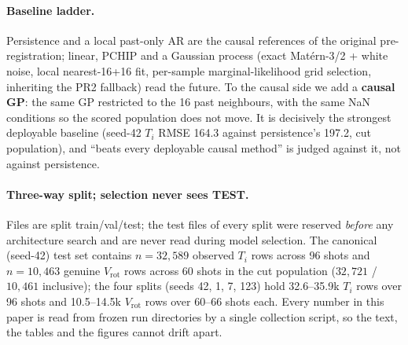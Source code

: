 \documentclass[10pt]{article}
\newcommand{\Ti}{\ensuremath{T_i}}
\newcommand{\Vrot}{\ensuremath{V_\mathrm{rot}}}
\begin{document}
\paragraph{Baseline ladder.}
Persistence and a local past-only AR are the causal references of the original
pre-registration; linear, PCHIP and a Gaussian process (exact Matérn-3/2 + white
noise, local nearest-16+16 fit, per-sample marginal-likelihood grid selection,
inheriting the PR2 fallback) read the future. To the causal side we add a
\textbf{causal GP}: the same GP restricted to the 16 past neighbours, with the same
NaN conditions so the scored population does not move. It is decisively the
strongest deployable baseline (seed-42 \Ti{} RMSE 164.3 against persistence's
197.2, cut population), and ``beats every deployable causal method'' is judged
against it, not against persistence.

\paragraph{Three-way split; selection never sees TEST.}
Files are split train/val/test; the test files of every split were reserved
\emph{before} any architecture search and are never read during model selection.
The canonical (seed-42) test set contains $n = 32{,}589$ observed \Ti{} rows across
96 shots and $n = 10{,}463$ genuine \Vrot{} rows across 60 shots in the cut
population ($32{,}721$ / $10{,}461$ inclusive); the four splits (seeds 42, 1, 7,
123) hold 32.6--35.9k \Ti{} rows over 96 shots and 10.5--14.5k \Vrot{} rows over
60--66 shots each. Every number in this paper is read from frozen run directories
by a single collection script, so the text, the tables and the figures cannot
drift apart.
\end{document}
